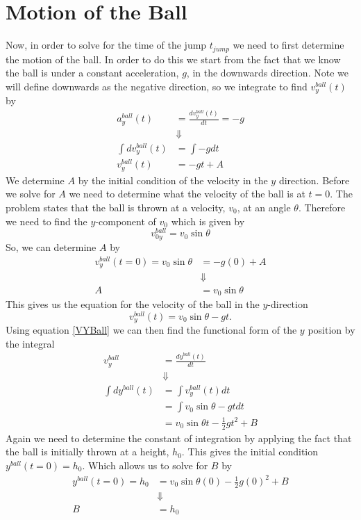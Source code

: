 \documentclass[11pt]{article}
\begin{document}
\section{Motion of the Ball}
Now, in order to solve for the time of the jump $t_{jump}$ we need to first determine the 
motion of the ball. In order to do this we start from the fact that we know the ball is
under a constant acceleration, $g$, in the downwards direction. Note we will define 
downwards as the negative direction, so we integrate to find $v^{ball}_{y}(t)$ by
\begin{align*}
a^{ball}_y(t) &= \frac{dv^{ball}_{y}(t)}{dt} = -g\\
&\Downarrow\\
\int dv^{ball}_{y}(t) &= \int-gdt\\
v^{ball}_y(t) &= -gt + A
\end{align*}
We determine $A$ by the initial condition of the velocity in the $y$ direction. Before we solve for $A$ we need to 
determine what the velocity of the ball is at $t=0$. The problem states that the ball is 
thrown at a velocity, $v_0$, at an angle $\theta$. Therefore we need to find the 
$y$-component of $v_0$ which is given by 
$$v^{ball}_{0y} = v_0\sin\theta$$
So, we can determine $A$ by
\begin{align*}
v^{ball}_y(t=0) = v_0\sin\theta &= -g(0) + A\\
&\Downarrow\\
A &= v_0\sin\theta
\end{align*}
This gives us the equation for the velocity of the ball in the $y$-direction
\begin{equation}
v^{ball}_{y}(t) = v_0\sin\theta - gt.
\label{VYBall}
\end{equation}
Using equation \ref{VYBall} we can then find the functional form of the $y$ position by
the integral
\begin{align*}
v^{ball}_y &= \frac{dy^{ball}(t)}{dt}\\
&\Downarrow\\
\int dy^{ball}(t) &= \int v^{ball}_{y}(t)dt\\
&= \int v_0\sin\theta - gt dt\\
&= v_0\sin\theta t - \frac{1}{2}gt^2 + B
\end{align*}
Again we need to determine the constant of integration by applying the fact that the ball is 
initially thrown at a height, $h_0$. This gives the initial condition $y^{ball}(t=0) = h_0$.
Which allows us to solve for $B$ by
\begin{align*}
y^{ball}(t=0) = h_0 &= v_0\sin\theta(0) - \frac{1}{2}g(0)^2 + B\\
&\Downarrow\\
B &= h_0
\end{align*}
\end{document}
